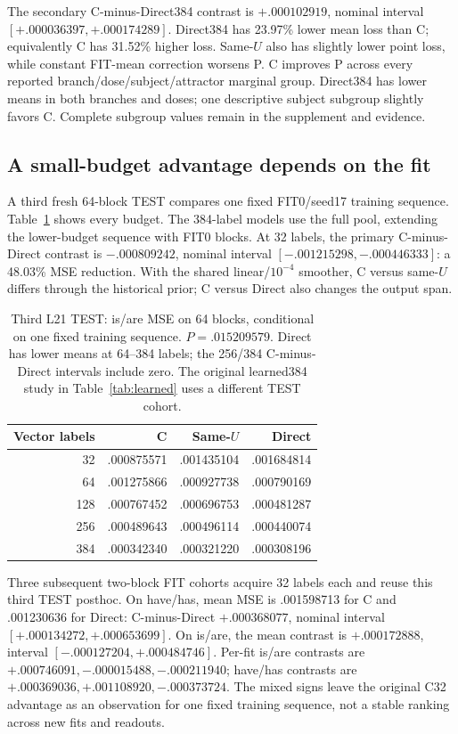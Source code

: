 \documentclass[11pt]{article}
\begin{document}
The secondary C-minus-Direct384 contrast is $+.000102919$, nominal interval $[+.000036397,+.000174289]$. Direct384 has 23.97\% lower mean loss than C; equivalently C has 31.52\% higher loss. Same-$U$ also has slightly lower point loss, while constant FIT-mean correction worsens P. C improves P across every reported branch/dose/subject/attractor marginal group. Direct384 has lower means in both branches and doses; one descriptive subject subgroup slightly favors C. Complete subgroup values remain in the supplement and evidence.

\subsection{A small-budget advantage depends on the fit}
A third fresh 64-block TEST compares one fixed FIT0/seed17 training sequence. Table~\ref{tab:budget} shows every budget. The 384-label models use the full pool, extending the lower-budget sequence with FIT0 blocks. At 32 labels, the primary C-minus-Direct contrast is $-.000809242$, nominal interval $[-.001215298,-.000446333]$: a 48.03\% MSE reduction. With the shared linear/$10^{-4}$ smoother, C versus same-$U$ differs through the historical prior; C versus Direct also changes the output span.

\begin{table}[ht]\centering\small
\begin{tabular}{rrrr}\toprule Vector labels & C & Same-$U$ & Direct\\\midrule
32 & .000875571 & .001435104 & .001684814\\
64 & .001275866 & .000927738 & .000790169\\
128 & .000767452 & .000696753 & .000481287\\
256 & .000489643 & .000496114 & .000440074\\
384 & .000342340 & .000321220 & .000308196\\\bottomrule\end{tabular}
\caption{Third L21 TEST: is/are MSE on 64 blocks, conditional on one fixed training sequence. $P=.015209579$. Direct has lower means at 64--384 labels; the 256/384 C-minus-Direct intervals include zero. The original learned384 study in Table~\ref{tab:learned} uses a different TEST cohort.}\label{tab:budget}
\end{table}

Three subsequent two-block FIT cohorts acquire 32 labels each and reuse this third TEST posthoc. On have/has, mean MSE is .001598713 for C and .001230636 for Direct: C-minus-Direct $+.000368077$, nominal interval $[+.000134272,+.000653699]$. On is/are, the mean contrast is $+.000172888$, interval $[-.000127204,+.000484746]$. Per-fit is/are contrasts are $+.000746091,-.000015488,-.000211940$; have/has contrasts are $+.000369036,+.001108920,-.000373724$. The mixed signs leave the original C32 advantage as an observation for one fixed training sequence, not a stable ranking across new fits and readouts.
\end{document}
